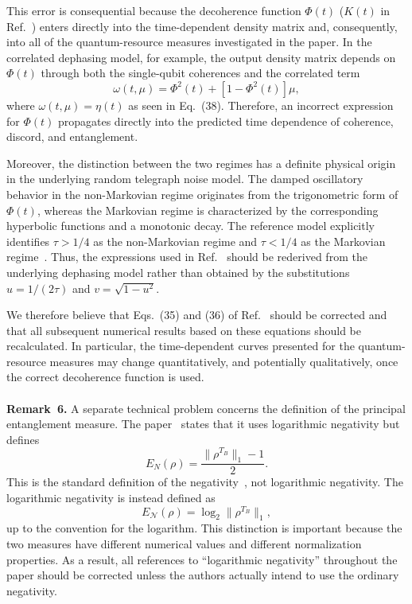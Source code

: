 \documentclass[epjc,twocolumn,nofootinbib,preprintnumbers,amsmath,amssymb]{revtex4-2}
\begin{document}
This error is consequential because the decoherence function $\Phi(t)$ ($K(t)$ in Ref.~\cite{Bachain}) enters
directly into the time-dependent density matrix and, consequently, into all
of the quantum-resource measures investigated in the paper. In the correlated
dephasing model, for example, the output density matrix depends on
$\Phi(t)$ through both the single-qubit coherences and the correlated term
\begin{equation}
\omega(t,\mu)=\Phi^2(t)+[1-\Phi^2(t)]\mu,
\end{equation}
where $\omega(t,\mu)=\eta(t)$ as seen in Eq.~(38). Therefore, an incorrect expression for $\Phi(t)$ propagates directly into
the predicted time dependence of coherence, discord, and entanglement.

Moreover, the distinction between the two regimes has a definite physical
origin in the underlying random telegraph noise model. The damped oscillatory
behavior in the non-Markovian regime originates from the trigonometric form of
$\Phi(t)$, whereas the Markovian regime is characterized by the corresponding
hyperbolic functions and a monotonic decay. The reference model explicitly
identifies $\tau>1/4$ as the non-Markovian regime and $\tau<1/4$ as the
Markovian regime~\cite{HuZhou2019}. Thus, the expressions used in Ref.~\cite{Bachain}
should be rederived from the underlying dephasing model rather than obtained
by the substitutions $u=1/(2\tau)$ and $v=\sqrt{1-u^2}$.

We therefore believe that Eqs.~(35) and (36) of Ref.~\cite{Bachain} should be corrected
and that all subsequent numerical results based on these equations should be
recalculated. In particular, the time-dependent curves presented for the
quantum-resource measures may change quantitatively, and potentially
qualitatively, once the correct decoherence function is used.
\\
\\
\textbf{Remark~6.}
A separate technical problem concerns the definition of the principal entanglement measure.
The paper~\cite{Bachain} states that it uses logarithmic negativity but defines
\begin{equation}
E_N(\rho)
=
\frac{\|\rho^{T_B}\|_1-1}{2}.
\end{equation}
This is the standard definition of the negativity~\cite{Vidal2002},
not logarithmic negativity.
The logarithmic negativity is instead defined as
\begin{equation}
E_{\mathcal N}(\rho)
=
\log_2\|\rho^{T_B}\|_1,
\end{equation}
up to the convention for the logarithm.
This distinction is important because the two measures have different numerical values and different normalization properties. As a result, all references to ``logarithmic negativity'' throughout the paper should be corrected unless the authors actually intend to use the ordinary negativity.
\end{document}
